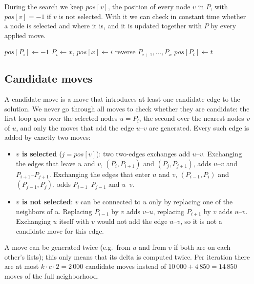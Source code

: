 \documentclass[11pt,a4paper]{article}
\begin{document}
During the search we keep $\mathit{pos}[v]$, the position of every node $v$ in $P$, with
$\mathit{pos}[v] = -1$ if $v$ is not selected. With it we can check in constant time whether a node is
selected and where it is, and it is updated together with $P$ by every applied move.

\begin{algorithm}[H]
\caption{Applying a move}
\begin{algorithmic}[1]
   
    \State $\mathit{pos}[P_i] \gets -1$
    \State $P_i \gets x$, $\mathit{pos}[x] \gets i$
  \Else {}
    \State reverse $P_{i+1}, \dots, P_x$
      \State $\mathit{pos}[P_t] \gets t$
    \EndFor
  \EndIf
\EndFunction
\end{algorithmic}
\end{algorithm}

\subsection*{Candidate moves}
A candidate move is a move that introduces at least one candidate edge to the solution. We never
go through all moves to check whether they are candidate: the first loop goes over the selected nodes
$u = P_i$, the second over the nearest nodes $v$ of $u$, and only the moves that add the edge $u$--$v$
are generated. Every such edge is added by exactly two moves:
\begin{itemize}
  \item \textbf{$v$ is selected} ($j = \mathit{pos}[v]$): two two-edges exchanges add $u$--$v$.
        Exchanging the edges that leave $u$ and $v$, $(P_i, P_{i+1})$ and $(P_j, P_{j+1})$, adds
        $u$--$v$ and $P_{i+1}$--$P_{j+1}$. Exchanging the edges that enter $u$ and $v$,
        $(P_{i-1}, P_i)$ and $(P_{j-1}, P_j)$, adds $P_{i-1}$--$P_{j-1}$ and $u$--$v$.
  \item \textbf{$v$ is not selected}: $v$ can be connected to $u$ only by replacing one of the
        neighbors of $u$. Replacing $P_{i-1}$ by $v$ adds $v$--$u$, replacing $P_{i+1}$ by $v$ adds
        $u$--$v$. Exchanging $u$ itself with $v$ would not add the edge $u$--$v$, so it is not a
        candidate move for this edge.
\end{itemize}
A move can be generated twice (e.g.\ from $u$ and from $v$ if both are on each other's lists); this
only means that its delta is computed twice. Per iteration there are at most $k \cdot c \cdot 2 =
2\,000$ candidate moves instead of $10\,000 + 4\,850 = 14\,850$ moves of the full neighborhood.
\end{document}

